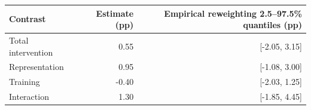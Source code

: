 \begin{tabular}{lrr}
\toprule
Contrast & Estimate (pp) & Empirical reweighting 2.5--97.5\% quantiles (pp) \\
\midrule
Total intervention & 0.55 & [-2.05, 3.15] \\
Representation & 0.95 & [-1.08, 3.00] \\
Training & -0.40 & [-2.03, 1.25] \\
Interaction & 1.30 & [-1.85, 4.45] \\
\bottomrule
\end{tabular}
